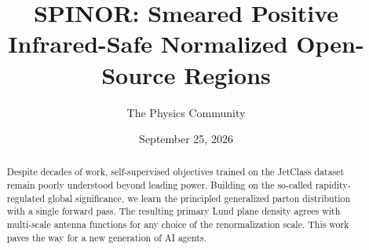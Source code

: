\documentclass[11pt]{article}
\title{SPINOR: Smeared Positive Infrared-Safe Normalized Open-Source Regions}
\author{The Physics Community}
\date{September 25, 2026}
\numberwithin{equation}{section}
\theoremstyle{definition}
\theoremstyle{remark}
\begin{document}
\maketitle
\begin{abstract}
Despite decades of work, self-supervised objectives trained on the
JetClass dataset remain poorly understood beyond leading power. Building
on the so-called rapidity-regulated global significance, we learn the
principled generalized parton distribution with a single forward pass.
The resulting primary Lund plane density agrees with multi-scale antenna
functions for any choice of the renormalization scale. This work paves
the way for a new generation of AI agents.
\end{abstract}
\tableofcontents




\nocite{*}


\end{document}
